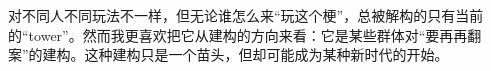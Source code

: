 \begin{zhihuanswer}
对不同人不同玩法不一样，但无论谁怎么来``玩这个梗''，总被解构的只有当前的``tower''。然而我更喜欢把它从建构的方向来看：它是某些群体对``要再再翻案''的建构。这种建构只是一个苗头，但却可能成为某种新时代的开始。
\end{zhihuanswer}
